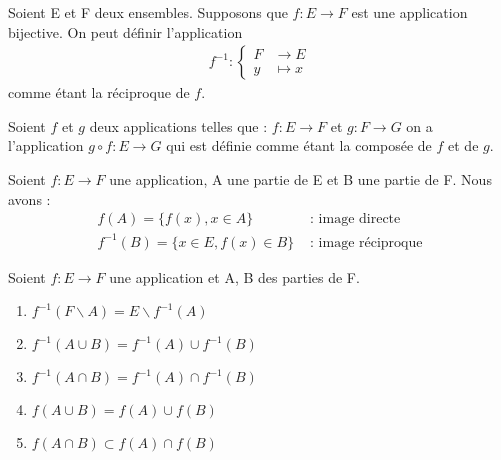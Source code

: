 \begin{definitionbox}
    \begin{definition}
	Soient E et F deux ensembles. Supposons que $f:E \to F$ est une application bijective. On peut définir l'application 
	\begin{align*}
		f^{-1} : 
		\begin{cases}
			F &\to E \\
			y &\mapsto x
		\end{cases}
	\end{align*}
	comme étant la réciproque de $f$.
\end{definition}
\end{definitionbox}

\begin{definitionbox}
    \begin{definition}[Composition]
	Soient $f$ et $g$ deux applications telles que :
	$f:E \to F$ et $g:F \to G$ on a l'application $g \circ f : E \to G$ qui est définie comme étant la composée de $f$ et de $g$.
\end{definition}
\end{definitionbox}

\begin{definitionbox}
    \begin{definition}
	Soient $f:E \to F$ une application, A une partie de E et B une partie de F. Nous avons :
	\begin{align*}
		f(A) = \{f(x), x \in A\} &\text{ : image directe} \\
		f^{-1}(B) = \{x \in E, f(x) \in B\} &\text{ : image réciproque}
	\end{align*}
\end{definition}
\end{definitionbox}

\begin{propositionbox}
    \begin{proposition}
	Soient $f:E \to F$ une application et A, B des parties de F.
	\begin{enumerate}
		\item \label{prop_img_1} $f^{-1}(F \backslash A) = E \backslash f^{-1}(A)$
		\item \label{prop_img_2} $f^{-1}(A \cup B) = f^{-1}(A) \cup f^{-1}(B)$
		\item \label{prop_img_3} $f^{-1}(A \cap B) = f^{-1}(A) \cap f^{-1}(B)$
		\item \label{prop_img_4} $f(A \cup B) = f(A) \cup f(B)$
		\item \label{prop_img_5} $f(A \cap B) \subset f(A) \cap f(B)$
	\end{enumerate}
\end{proposition}
\end{propositionbox}

